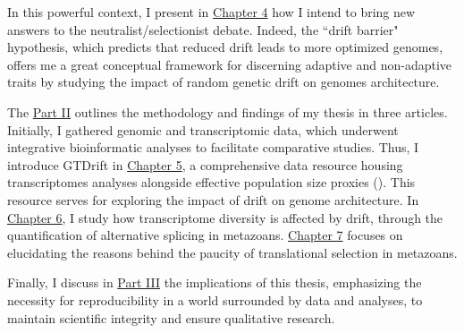 In this powerful context, I present in \hyperref[chap:intro-objectives]{Chapter 4} how I intend to bring new answers to the neutralist/selectionist debate. Indeed, the “drift barrier" hypothesis, which predicts that reduced drift leads to more optimized genomes, offers me a great conceptual framework for discerning adaptive and non-adaptive traits by studying the impact of random genetic drift on genomes architecture.

The \hyperref[part:studies]{Part II} outlines the methodology and findings of my thesis in three articles. Initially, I gathered genomic and transcriptomic data, which underwent integrative bioinformatic analyses to facilitate comparative studies. Thus, I introduce GTDrift in \hyperref[chap:chap5-GTDrift]{Chapter 5}, a comprehensive data resource housing transcriptomes analyses alongside effective population size proxies (\Ne). This resource serves for exploring the impact of drift on genome architecture. In \hyperref[chap:AlternativeSplicing]{Chapter 6}, I study how transcriptome diversity is affected by drift, through the quantification of alternative splicing in metazoans. \hyperref[chap:CodonUsage]{Chapter 7} focuses on elucidating the reasons behind the paucity of translational selection in metazoans.

Finally, I discuss in \hyperref[chap:conclusion]{Part III} the implications of this thesis, emphasizing the necessity for reproducibility in a world surrounded by data and analyses, to maintain scientific integrity and ensure qualitative research.

